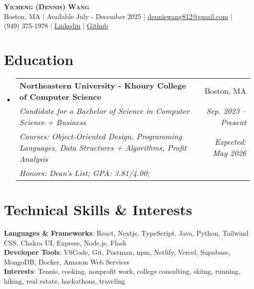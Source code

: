 \documentclass[letterpaper,11pt]{article}
\makeatletter
\newcommand{\eduSubheading}[7]{
  \vspace{-2pt}\item
    \begin{tabular*}{0.97\textwidth}[t]{l@{\extracolsep{\fill}}r}
      \textbf{#1} & #2 \\
      \vspace{-2pt}
      \textit{\small#3} & \hspace{-10cm}\textit{\small #4} \\
      \vspace{-2pt}
      \textit{\footnotesize#5}&\textit{\small #6} \\
      
      \textit{\footnotesize#7}
    \end{tabular*}\vspace{-6pt}
}
\newcommand{\resumeSubHeadingListStart}{\begin{itemize}[leftmargin=0.15in, label={}]}
\newcommand{\resumeSubHeadingListEnd}{\end{itemize}}
\makeatother
\begin{document}

\begin{center}
\textbf{\Huge \scshape Yicheng (Dennis) Wang} \\ \vspace{1pt}
\small Boston, MA  $|$ Available July - December 2025 $|$ \href{mailto:denniswang812@gmail.com}{\underline{denniswang812@gmail.com}} $|$ (949) 375-1978 $|$ \href{https://www.linkedin.com/in/denniswang812/}{\underline{Linkedin}} $|$ \href{https://github.com/denniwang}{\underline{Github}} 
\end{center} 


\section{Education}
  \resumeSubHeadingListStart
    \eduSubheading
      {Northeastern University - Khoury College of Computer Science}{Boston, MA}
      {Candidate for a Bachelor of Science in Computer Science + Business} {Sep. 2023 -- Present}
       {Courses: Object-Oriented Design, Programming Languages, Data Structures + Algorithms, Profit Analysis}{Expected: May 2026}
       {Honors: Dean's List; GPA: 3.81/4.00;}
  \resumeSubHeadingListEnd


\section{Technical Skills \& Interests}
 \begin{itemize}[leftmargin=0.15in, label={}]
    \small{\item{
     \textbf{Languages \& Frameworks}{: React, Nextjs, TypeScript, Java, Python, Tailwind CSS, Chakra UI, Express, Node.js, Flask} \\
     \textbf{Developer Tools}{: VSCode, Git, Postman, npm, Netlify, Vercel, Supabase, MongoDB, Docker,  Amazon Web Services} \\
     \textbf{Interests}{: Tennis, cooking, nonprofit work, college consulting, skiing, running, hiking, real estate, hackathons, traveling}
     \vspace{-5pt}
    }}
    
 \end{itemize}

\end{document}
